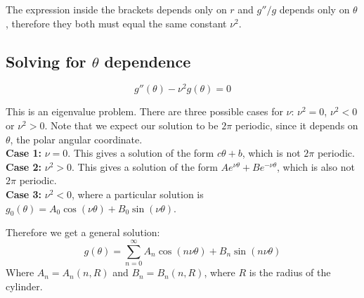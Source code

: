 The expression inside the brackets depends only on $r$ and $g''/g$ depends only on $\theta$, therefore they both must equal the same constant $\nu^2$. \\

\subsection{Solving for \texorpdfstring{$\theta$}{theta} dependence}

\begin{equation}\label{phi_scattered_eigenvalue}
    g''(\theta) - \nu^2 g(\theta) = 0
\end{equation}

This is an eigenvalue problem. There are three possible cases for $\nu$: $\nu^2=0$, $\nu^2 < 0$ or $\nu^2 > 0$. Note that we expect our solution to be $2\pi$ periodic, since it depends on $\theta$, the polar angular coordinate.\\

\textbf{Case 1:} $\nu = 0$. This gives a solution of the form $c \theta + b$, which is not $2 \pi$ periodic. \\
\textbf{Case 2:} $\nu^2 > 0$. This gives a solution of the form $A e ^{\nu \theta} + B e^{- \nu \theta}$, which is also not $2 \pi$ periodic. \\
\textbf{Case 3:} $\nu^2 < 0$, where a particular solution is $g_0(\theta) = A_0 \cos (\nu \theta) + B_0\sin( \nu \theta)$. 

Therefore we get a general solution:
\begin{equation}
    g(\theta) = \sum_{n=0} ^\infty A_n \cos (n \nu \theta) + B_n \sin (n \nu \theta) 
\end{equation}
Where $A_n = A_n(n, R) $ and $B_n = B_n (n, R)$, where $R$ is the radius of the cylinder.



